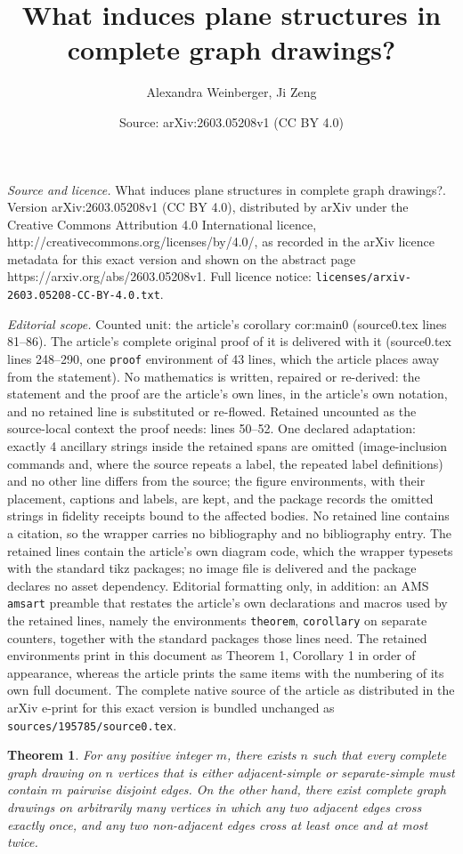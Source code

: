\documentclass[10pt,a4paper]{amsart}
\title{What induces plane structures in complete graph drawings?}
\author{Alexandra Weinberger, Ji Zeng}
\date{Source: arXiv:2603.05208v1 (CC BY 4.0)}
\newtheorem{theorem}{Theorem}
\begin{document}
\maketitle

\noindent\emph{Source and licence.} What induces plane structures in complete graph drawings?. Version arXiv:2603.05208v1 (CC BY 4.0), distributed by arXiv under the Creative Commons Attribution 4.0 International licence, http://creativecommons.org/licenses/by/4.0/, as recorded in the arXiv licence metadata for this exact version and shown on the abstract page https://arxiv.org/abs/2603.05208v1. Full licence notice: \texttt{licenses/arxiv-2603.05208-CC-BY-4.0.txt}.\par\smallskip

\noindent\textit{Editorial scope.} Counted unit: the article's corollary cor:main0 (source0.tex lines 81--86). The article's complete original proof of it is delivered with it (source0.tex lines 248--290, one \texttt{proof} environment of 43 lines, which the article places away from the statement). No mathematics is written, repaired or re-derived: the statement and the proof are the article's own lines, in the article's own notation, and no retained line is substituted or re-flowed.  Retained uncounted as the source-local context the proof needs: lines 50--52.  One declared adaptation: exactly 4 ancillary strings inside the retained spans are omitted (image-inclusion commands and, where the source repeats a label, the repeated label definitions) and no other line differs from the source; the figure environments, with their placement, captions and labels, are kept, and the package records the omitted strings in fidelity receipts bound to the affected bodies.  No retained line contains a citation, so the wrapper carries no bibliography and no bibliography entry.  The retained lines contain the article's own diagram code, which the wrapper typesets with the standard tikz packages; no image file is delivered and the package declares no asset dependency.  Editorial formatting only, in addition: an AMS \texttt{amsart} preamble that restates the article's own declarations and macros used by the retained lines, namely the environments \texttt{theorem}, \texttt{corollary} on separate counters, together with the standard packages those lines need.  The retained environments print in this document as Theorem 1, Corollary 1 in order of appearance, whereas the article prints the same items with the numbering of its own full document.  The complete native source of the article as distributed in the arXiv e-print for this exact version is bundled unchanged as \texttt{sources/195785/source0.tex}.
\begin{theorem}\label{thm:main1}
    For any positive integer $m$, there exists $n$ such that every complete graph drawing on $n$ vertices that is either adjacent-simple or separate-simple must contain $m$ pairwise disjoint edges. On the other hand, there exist complete graph drawings on arbitrarily many vertices in which any two adjacent edges cross exactly once, and any two non-adjacent edges cross at least once and at most twice.
\end{theorem}
\end{document}
